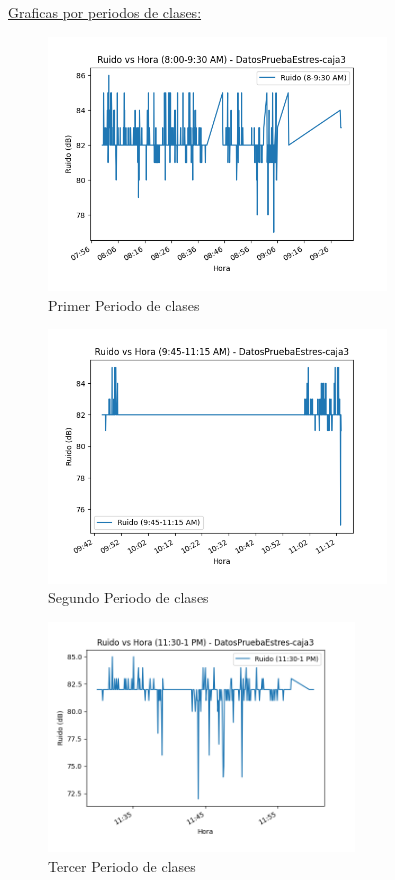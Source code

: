\documentclass{templateNote}
\begin{document}
\newpage    
\underline{Graficas por periodos de clases:}
\begin{figure}[H]
    \centering
    \includegraphics[width=0.8\textwidth]{img/DatosPruebaEstres-caja3_ruido_8_9-30_am.png}
    \caption{Primer Periodo de clases}
\end{figure}

\begin{figure}[H]
    \centering
    \includegraphics[width=0.8\textwidth]{img/DatosPruebaEstres-caja3_ruido_9-45_11-15_am.png}
    \caption{Segundo Periodo de clases}
\end{figure}

\begin{figure}[H]
    \centering
    \includegraphics[width=0.725\textwidth]{img/DatosPruebaEstres-caja3_ruido_11-30_1_pm.png}
    \caption{Tercer Periodo de clases}
\end{figure}
\end{document}
